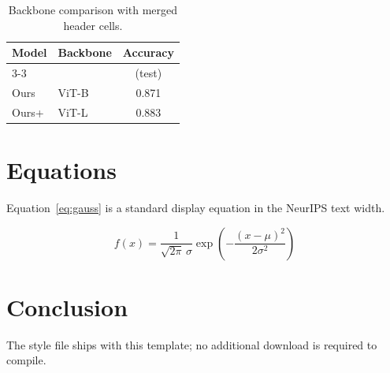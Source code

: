 \documentclass{article}
\begin{document}
\begin{table}[h]
  \caption{Backbone comparison with merged header cells.}
  \label{tab:merged}
  \centering
  \begin{tabular}{llc}
    \toprule
    \multirow{2}{*}{Model} & \multirow{2}{*}{Backbone} & Accuracy \\
    \cmidrule(l){3-3}
     & & (test) \\
    \midrule
    Ours  & ViT-B & 0.871 \\
    Ours+ & ViT-L & 0.883 \\
    \bottomrule
  \end{tabular}
\end{table}

\section{Equations}
Equation~\eqref{eq:gauss} is a standard display equation in the
NeurIPS text width.

\begin{equation}
  f(x)=\frac{1}{\sqrt{2\pi}\,\sigma}
  \exp\!\left(-\frac{(x-\mu)^2}{2\sigma^2}\right)
  \label{eq:gauss}
\end{equation}

\section{Conclusion}
The style file ships with this template; no additional download is
required to compile.



\end{document}
